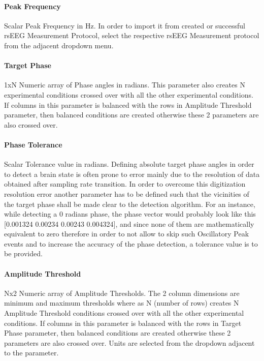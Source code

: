 \documentclass[letterpaper,10pt,english]{sphinxmanual}
\begin{document}
\paragraph{Peak Frequency}
\label{\detokenize{9_MEPMeasurement:peak-frequency}}
\sphinxAtStartPar
Scalar Peak Frequency in Hz. In order to import it from created or successful rsEEG Measurement Protocol, select the respective rsEEG Measurement protocol from the adjacent dropdown menu.


\paragraph{Target Phase}
\label{\detokenize{9_MEPMeasurement:target-phase}}
\sphinxAtStartPar
1xN Numeric array of Phase angles in radians. This parameter also creates N experimental conditions crossed over with all the other experimental conditions. If columns in this parameter is balanced with the rows in Amplitude Threshold parameter, then balanced conditions are created otherwise these 2 parameters are also crossed over.


\paragraph{Phase Tolerance}
\label{\detokenize{9_MEPMeasurement:phase-tolerance}}
\sphinxAtStartPar
Scalar Tolerance value in radians. Defining absolute target phase angles in order to detect a brain state is often prone to error mainly due to the resolution of data obtained after sampling rate transition. In order to overcome this digitization resolution error another parameter has to be defined such that the vicinities of the target phase shall be made clear to the detection algorithm. For an instance, while detecting a 0 radians phase, the phase vector would probably look like this {[}\sphinxhyphen{}0.001324 \sphinxhyphen{}0.00234 0.00243 0.004324{]}, and since none of them are mathematically equivalent to zero therefore in order to not allow to skip such Oscillatory Peak events and to increase the accuracy of the phase detection, a tolerance value is to be provided.


\paragraph{Amplitude Threshold}
\label{\detokenize{9_MEPMeasurement:amplitude-threshold}}
\sphinxAtStartPar
Nx2 Numeric array of Amplitude Thresholds. The 2 column dimensions are minimum and maximum thresholds where as N (number of rows) creates N Amplitude Threshold conditions crossed over with all the other experimental conditions. If columns in this parameter is balanced with the rows in Target Phase parameter, then balanced conditions are created otherwise these 2 parameters are also crossed over. Units are selected from the drop\sphinxhyphen{}down adjacent to the parameter.
\end{document}
